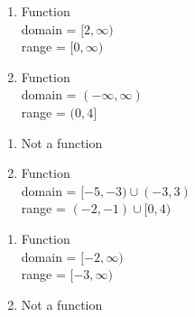 \begin{multicols}{2}
\begin{enumerate}
\setcounter{enumi}{\value{HW}}

\item Function \\ domain = $[2, \infty)$ \\ range = $[0, \infty)$

\vfill

\columnbreak

\item Function \\ domain = $(-\infty, \infty)$ \\ range = $(0, 4]$

\setcounter{HW}{\value{enumi}}
\end{enumerate}
\end{multicols}


\begin{multicols}{2}
\begin{enumerate}
\setcounter{enumi}{\value{HW}}

\item Not a function


\vfill

\columnbreak

\item Function \\ domain = $[-5,-3) \cup(-3, 3)$ \\ range = $(-2, -1) \cup [0, 4)$

\setcounter{HW}{\value{enumi}}
\end{enumerate}
\end{multicols}


\begin{multicols}{2}
\begin{enumerate}
\setcounter{enumi}{\value{HW}}

\item  Function \\  domain =  $[-2, \infty)$ \\ range = $[-3, \infty)$

\vfill

\columnbreak

\item Not a function

\setcounter{HW}{\value{enumi}}
\end{enumerate}
\end{multicols}


